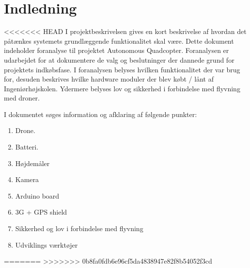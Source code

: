 \section{Indledning}

<<<<<<< HEAD
I projektbeskrivelsen gives en kort beskrivelse af hvordan det påtænkes systemets grundlæggende funktionalitet skal være. Dette dokument indeholder foranalyse til projektet Autonomous Quadcopter. 
Foranalysen er udarbejdet for at dokumentere de valg og beslutninger der dannede grund for projektets indkøbsfase. I foranalysen belyses hvilken funktionalitet der var brug for, desuden beskrives hvilke hardware moduler der blev købt / lånt af Ingeniørhøjskolen. Ydermere belyses lov og sikkerhed i forbindelse med flyvning med droner.

I dokumentet søges information og afklaring af følgende punkter:
\begin{enumerate}[label*=\arabic*.]
	\item Drone.
	\item Batteri. 
	\item Højdemåler
	\item Kamera
	\item Arduino board
	\item 3G + GPS shield
	\item Sikkerhed og lov i forbindelse med flyvning
	\item Udviklings værktøjer
\end{enumerate}
=======
>>>>>>> 0b8fa0fdb6e96cf5da4838947e82f8b54052f3cd
